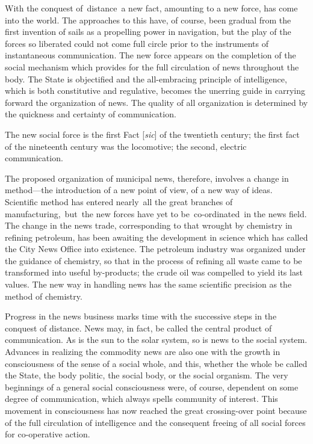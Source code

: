 \documentclass[openany,nobib]{tufte-book}
\begin{document}
With the conquest of~distance~a new fact, amounting to a new force, has
come into the world. The approaches to this have, of course, been
gradual from the first invention of sails as a propelling power in
navigation, but the play of the forces so liberated could not come full
circle prior to the instruments of instantaneous communication. The new
force appears on the completion of the social mechanism which provides
for the full circulation of news throughout the body. The State is
objectified and the all-embracing principle of intelligence, which is
both constitutive and regulative, becomes the unerring guide in carrying
forward the organization of news. The quality of all organization is
determined by the quickness and certainty of communication.~

The new social force is the first Fact {[}\emph{sic}{]} of the twentieth
century; the first fact of the nineteenth century was the locomotive;
the second, electric communication.~

The proposed organization of municipal news, therefore, involves a
change in method---the introduction of a new point of view, of a new way
of ideas. Scientific method has entered nearly~all the great branches of
manufacturing,~but~the new forces have yet to be~co-ordinated~in the
news field. The change in the news trade, corresponding to that wrought
by chemistry in refining petroleum, has been awaiting the development in
science which has called the City News Office into existence. The
petroleum industry was organized under the guidance of chemistry, so
that in the process of refining all waste came to be transformed into
useful by-products; the crude oil was compelled to yield its last
values. The new way in handling news has the same scientific precision
as the method of chemistry.~

Progress in the news business marks time with the successive steps in
the conquest of distance. News may, in fact, be called the central
product of communication. As is the sun to the solar system, so is news
to the social system. Advances in realizing the commodity news are also
one with the growth in consciousness of the sense of a social whole, and
this, whether the whole be called the State, the body politic, the
social body, or the social organism. The very beginnings of a general
social consciousness were, of course, dependent on some degree of
communication, which always spells community of interest. This movement
in consciousness has now reached the great crossing-over point because
of the full circulation of intelligence and the consequent freeing of
all social forces for co-operative action.~
\end{document}
